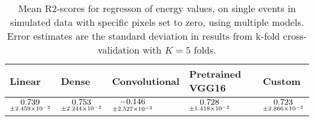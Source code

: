 \begin{table}
\centering
\caption{
Mean R2-scores for regresson of energy values, on single events in simulated data with specific pixels
set to zero, using multiple models. 
Error estimates are the standard deviation in results from k-fold cross-validation 
with $K=5$ folds.
}
\label{tab:regression-simulated-single-energy-pixelmod-r2}
\begin{tabular}{lllll}
\toprule
                                             Linear &                                               Dense &                                        Convolutional &                                    Pretrained VGG16 &                                              Custom \\
\midrule
 $\underset{\num{+- 2.459e-02 }  }{\num{ 0.739 } }$ &  $\underset{\num{+- 2.244e-02 }  }{\num{ 0.753 } }$ &  $\underset{\num{+- 2.527e-02 }  }{\num{ -0.146 } }$ &  $\underset{\num{+- 1.418e-02 }  }{\num{ 0.728 } }$ &  $\underset{\num{+- 2.866e-02 }  }{\num{ 0.723 } }$ \\
\bottomrule
\end{tabular}
\end{table}
